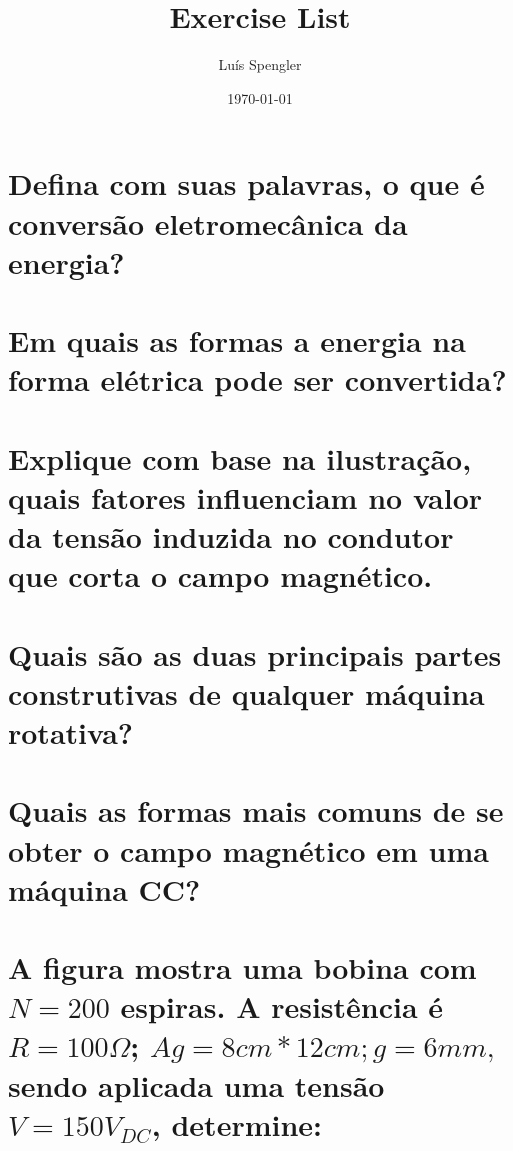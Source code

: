 \documentclass{article}
\author{Luís Spengler}
\title{Exercise List}
\date{\today}
\begin{document}
\maketitle
\sffamily

\section{Defina com suas palavras, o que é conversão eletromecânica da energia?} %
\section{Em quais as formas a energia na forma elétrica pode ser convertida?} %
\section{Explique com base na ilustração, quais fatores influenciam no valor da tensão induzida no condutor que corta o campo magnético.} %

\section{Quais são as duas principais partes construtivas de qualquer máquina rotativa?} %
\section{Quais as formas mais comuns de se obter o campo magnético em uma máquina CC?} %

\section{A figura mostra uma bobina com \(N=200\) espiras. A resistência é \(R=100\Omega\); \(Ag=8cm*12cm; g= 6mm,\) sendo aplicada uma tensão \(V=150V_{DC}\), determine:} %
\end{document}
